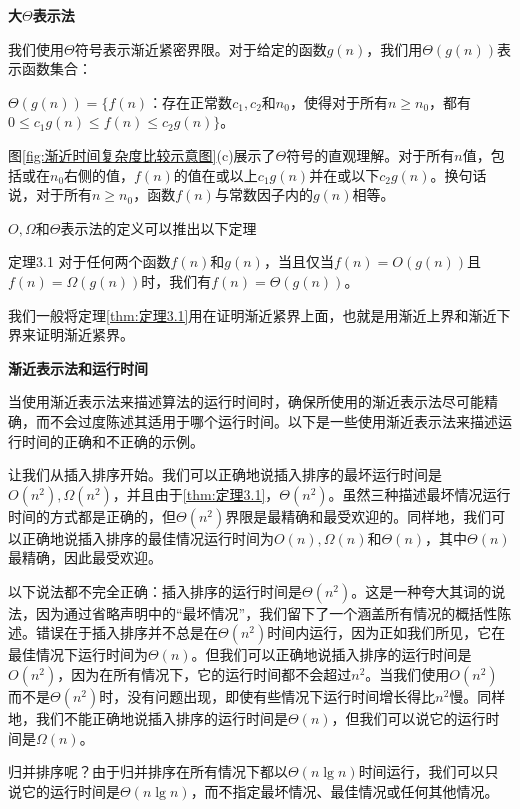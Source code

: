 \documentclass[lang=cn,newtx,10pt,scheme=chinese]{elegantbook}
\begin{document}
\textbf{大$\Theta$表示法}

我们使用$\Theta$符号表示渐近紧密界限。对于给定的函数$g(n)$，我们用$\Theta(g(n))$表示函数集合：

$\Theta(g(n))=\{f(n)$：存在正常数$c_1, c_2$和$n_0$，使得对于所有$n \geq n_0$，都有$0 \leq c_1 g(n) \leq f(n) \leq c_2 g(n)\}$。

图\ref{fig:渐近时间复杂度比较示意图}(c)展示了$\Theta$符号的直观理解。对于所有$n$值，包括或在$n_0$右侧的值，$f(n)$的值在或以上$c_1 g(n)$并在或以下$c_2 g(n)$。换句话说，对于所有$n \geq n_0$，函数$f(n)$与常数因子内的$g(n)$相等。

$O, \Omega$和$\Theta$表示法的定义可以推出以下定理

\begin{theorem}{}{定理3.1}
对于任何两个函数$f(n)$和$g(n)$，当且仅当$f(n)=O(g(n))$且$f(n)=\Omega(g(n))$时，我们有$f(n)=\Theta(g(n))$。
\end{theorem}

我们一般将定理\ref{thm:定理3.1}用在证明渐近紧界上面，也就是用渐近上界和渐近下界来证明渐近紧界。

\textbf{渐近表示法和运行时间}

当使用渐近表示法来描述算法的运行时间时，确保所使用的渐近表示法尽可能精确，而不会过度陈述其适用于哪个运行时间。以下是一些使用渐近表示法来描述运行时间的正确和不正确的示例。

让我们从插入排序开始。我们可以正确地说插入排序的最坏运行时间是$O\left(n^2\right), \Omega\left(n^2\right)$，并且由于\ref{thm:定理3.1}，$\Theta\left(n^2\right)$。虽然三种描述最坏情况运行时间的方式都是正确的，但$\Theta\left(n^2\right)$界限是最精确和最受欢迎的。同样地，我们可以正确地说插入排序的最佳情况运行时间为$O(n), \Omega(n)$和$\Theta(n)$，其中$\Theta(n)$最精确，因此最受欢迎。

以下说法都不完全正确：插入排序的运行时间是$\Theta\left(n^2\right)$。这是一种夸大其词的说法，因为通过省略声明中的``最坏情况''，我们留下了一个涵盖所有情况的概括性陈述。错误在于插入排序并不总是在$\Theta\left(n^2\right)$时间内运行，因为正如我们所见，它在最佳情况下运行时间为$\Theta(n)$。但我们可以正确地说插入排序的运行时间是$O\left(n^2\right)$，因为在所有情况下，它的运行时间都不会超过$n^2$。当我们使用$O\left(n^2\right)$而不是$\Theta\left(n^2\right)$时，没有问题出现，即使有些情况下运行时间增长得比$n^2$慢。同样地，我们不能正确地说插入排序的运行时间是$\Theta(n)$，但我们可以说它的运行时间是$\Omega(n)$。

归并排序呢？由于归并排序在所有情况下都以$\Theta(n\lg n)$时间运行，我们可以只说它的运行时间是$\Theta(n\lg n)$，而不指定最坏情况、最佳情况或任何其他情况。
\end{document}
